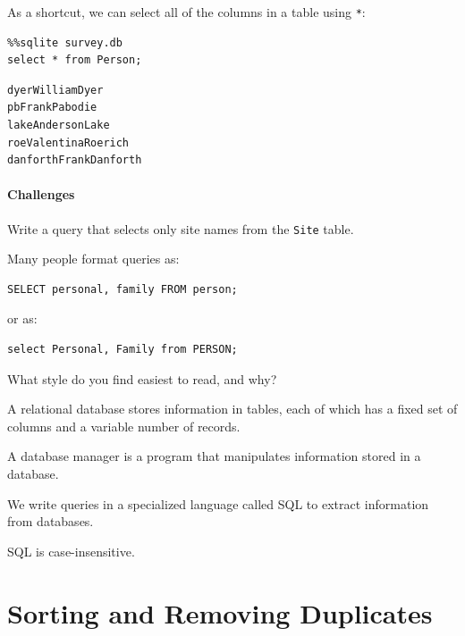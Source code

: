 \documentclass{book}
\begin{document}
As a shortcut, we can select all of the columns in a table using
\texttt{*}:

\begin{verbatim}
%%sqlite survey.db
select * from Person;
\end{verbatim}

\begin{verbatim}
dyerWilliamDyer
pbFrankPabodie
lakeAndersonLake
roeValentinaRoerich
danforthFrankDanforth
\end{verbatim}

\mbox{}\paragraph{Challenges}

\begin{swcenumerate}
\item
  Write a query that selects only site names from the \texttt{Site}
  table.
\item
  Many people format queries as:

\begin{verbatim}
SELECT personal, family FROM person;
\end{verbatim}

  or as:

\begin{verbatim}
select Personal, Family from PERSON;
\end{verbatim}

  What style do you find easiest to read, and why?
\end{swcenumerate}

\begin{keypoints}
\begin{swcitemize}
\item
  A relational database stores information in tables, each of which has
  a fixed set of columns and a variable number of records.
\item
  A database manager is a program that manipulates information stored in
  a database.
\item
  We write queries in a specialized language called SQL to extract
  information from databases.
\item
  SQL is case-insensitive.
\end{swcitemize}
\end{keypoints}

\section{Sorting and Removing Duplicates}
\end{document}

